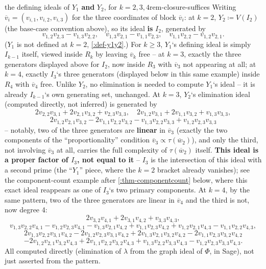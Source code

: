 \documentclass[a4paper,11pt]{scrartcl}
\begin{document}
\begin{example}{the defining ideals of \(Y_{1}\) \textbf{and} \(Y_{2}\), for \(k = 2,3,4\)}{rem-closure-suffices} Writing \({\overline{v}}_{i} = \left( v_{i,1},v_{i,2},v_{i,3} \right)\) for the three coordinates of block \({\overline{v}}_{i}\): at \(k = 2\), \(Y_{2} ≔ V\left( I_{2} \right)\) (the base-case convention above), so its ideal \textbf{is} \(I_{2}\), generated by \[v_{1,2}v_{2,3} - v_{1,3}v_{2,2},\quad v_{1,3}v_{2,1} - v_{1,1}v_{2,3},\quad v_{1,1}v_{2,2} - v_{1,2}v_{2,1}.\] (\(Y_{1}\) is not defined at \(k = 2\), \cref{:def-y1y2}.) For \(k \geq 3\), \(Y_{1}\)`s defining ideal is simply \(I_{k - 1}\) itself, viewed inside \(R_{k}\) by leaving \({\overline{v}}_{k}\) free -- at \(k = 3\), exactly the three generators displayed above for \(I_{2}\), now inside \(R_{3}\) with \({\overline{v}}_{3}\) not appearing at all; at \(k = 4\), exactly \(I_{3}\)`s three generators (displayed below in this same example) inside \(R_{4}\) with \({\overline{v}}_{4}\) free. Unlike \(Y_{2}\), no elimination is needed to compute \(Y_{1}\)`s ideal -- it is already \(I_{k - 1}\)`s own generating set, unchanged. At \(k = 3\), \(Y_{2}\)`s elimination ideal (computed directly, not inferred) is generated by \[2v_{2,2}v_{3,1} + 2v_{2,1}v_{3,2} + v_{2,3}v_{3,3},\quad 2v_{1,2}v_{3,1} + 2v_{1,1}v_{3,2} + v_{1,3}v_{3,3},\] \[2v_{1,2}v_{2,1}v_{3,2} - 2v_{1,1}v_{2,2}v_{3,2} - v_{1,3}v_{2,2}v_{3,3} + v_{1,2}v_{2,3}v_{3,3}\] -- notably, two of the three generators are \textbf{linear} in \({\overline{v}}_{3}\) (exactly the two components of the ``proportionality'' condition \({\overline{v}}_{3} \propto \tau({\overline{w}}_{2})\)), and only the third, not involving \({\overline{v}}_{3}\) at all, carries the full complexity of \(\tau({\overline{w}}_{2})\) itself. \textbf{This ideal is a proper factor of \(I_{3}\), not equal to it} -- \(I_{3}\) is the intersection of this ideal with a second prime (the ``\(Y_{1}\)'' piece, where the \(k = 2\) bracket already vanishes); see the component-count example after \cref{:thm-componentcount} below, where this exact ideal reappears as one of \(I_{3}\)`s two primary components. At \(k = 4\), by the same pattern, two of the three generators are linear in \({\overline{v}}_{4}\) and the third is not, now degree 4: \[2v_{3,2}v_{4,1} + 2v_{3,1}v_{4,2} + v_{3,3}v_{4,3},\] \[v_{1,3}v_{2,2}v_{4,1} - v_{1,2}v_{2,3}v_{4,1} - v_{1,3}v_{2,1}v_{4,2} + v_{1,1}v_{2,3}v_{4,2} + v_{1,2}v_{2,1}v_{4,3} - v_{1,1}v_{2,2}v_{4,3},\] \[2v_{1,3}v_{2,2}v_{3,1}v_{4,2} - 2v_{1,2}v_{2,3}v_{3,1}v_{4,2} + 2v_{1,3}v_{2,1}v_{3,2}v_{4,2} - 2v_{1,1}v_{2,3}v_{3,2}v_{4,2}\] \[- 2v_{1,2}v_{2,1}v_{3,2}v_{4,3} + 2v_{1,1}v_{2,2}v_{3,2}v_{4,3} + v_{1,3}v_{2,2}v_{3,3}v_{4,3} - v_{1,2}v_{2,3}v_{3,3}v_{4,3}.\] All computed directly (elimination of \(\lambda\) from the graph ideal of \(\Phi\), in Sage), not just asserted from the pattern.

\end{example}
\end{document}
